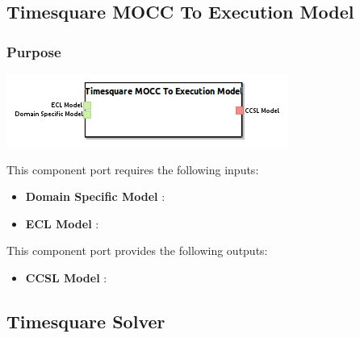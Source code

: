 \documentclass{gemoc} %
\begin{document}
\subsection{Timesquare MOCC To Execution Model}


\subsubsection{Purpose}


\begin{center}
\includegraphics*[trim=0.0cm 0.0cm 0cm 0.0cm, clip=true]{../images/generated/Generated_Timesquare_MOCC_To_Execution_Model.png}
\end{center}

This component port requires the following inputs:
\begin{itemize}
  \item \textbf{Domain Specific Model} :
  \item \textbf{ECL Model} :
\end{itemize}

This component port provides the following outputs:
\begin{itemize}
  \item \textbf{CCSL Model} :
\end{itemize}


\subsection{Timesquare Solver}
\end{document}

